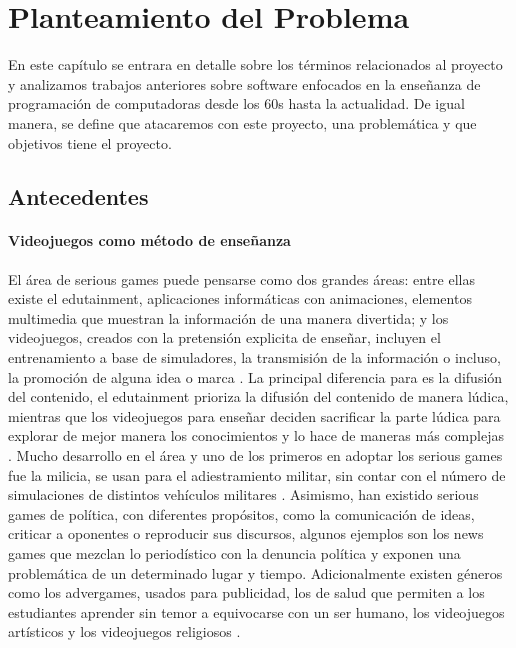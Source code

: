 \chapter{Planteamiento del Problema}
En este capítulo se entrara en detalle sobre los términos relacionados al proyecto y analizamos 
trabajos anteriores sobre software enfocados en la enseñanza de programación de computadoras desde los 
60s hasta la actualidad. De igual manera, se define que atacaremos con este proyecto, una problemática y que objetivos tiene el proyecto.

\section{Antecedentes}

\subsubsection{Videojuegos como método de enseñanza}
El área de serious games puede pensarse como dos grandes áreas: entre ellas existe el edutainment, 
aplicaciones informáticas con animaciones, elementos multimedia que muestran la información de una manera divertida; 
y los videojuegos, creados con la pretensión explicita de enseñar, incluyen el entrenamiento a base de simuladores, 
la transmisión de la información o incluso, la promoción de alguna idea o marca \cite{unknown2017a}. 
La principal diferencia para es la difusión del contenido, el edutainment prioriza 
la difusión del contenido de manera lúdica, mientras que los videojuegos para enseñar deciden 
sacrificar la parte lúdica para explorar de mejor manera los conocimientos y lo hace de maneras más complejas \cite{unknown2017a}.
Mucho desarrollo en el área y uno de los primeros en adoptar los serious games fue la milicia, 
se usan para el adiestramiento militar, sin contar con el número de simulaciones de distintos vehículos militares \cite{unknown2017a}. 
Asimismo, han existido serious games de política, con diferentes propósitos, como la comunicación de ideas, 
criticar a oponentes o reproducir sus discursos, 
algunos ejemplos son los news games que mezclan lo periodístico con la denuncia política y exponen una problemática de un determinado lugar y tiempo. 
Adicionalmente existen géneros como los advergames, usados para publicidad, 
los de salud que permiten a los estudiantes aprender sin temor a equivocarse con un ser humano, 
los videojuegos artísticos y los videojuegos religiosos \cite{unknown2017a}.

